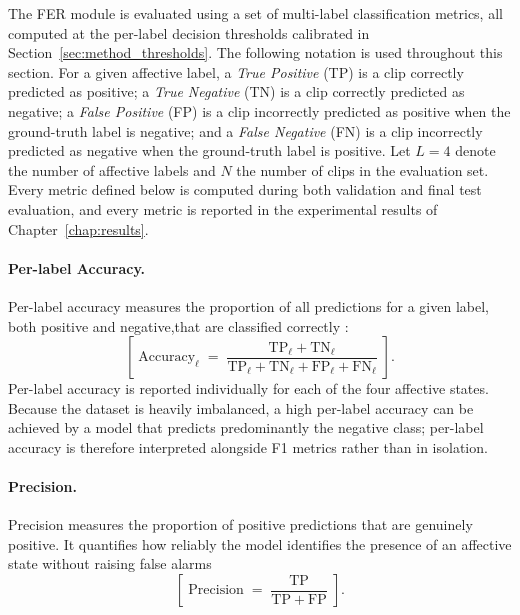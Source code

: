 The \ac{FER} module is evaluated using a set of multi-label classification metrics, all computed at the per-label decision thresholds calibrated in Section~\ref{sec:method_thresholds}. The following notation is used throughout this section. For a given affective label, a \emph{True Positive} (TP) is a clip correctly predicted as positive; a \emph{True Negative} (TN) is a clip correctly predicted as negative; a \emph{False Positive} (FP) is a clip incorrectly predicted as positive when the ground-truth label is negative; and a \emph{False Negative} (FN) is a clip incorrectly predicted as negative when the ground-truth label is positive. Let $L = 4$ denote the number of affective labels and $N$ the number of clips in the evaluation set. Every metric defined below is computed during both validation and final test evaluation, and every metric is reported in the experimental results of Chapter~\ref{chap:results}.

\paragraph{Per-label Accuracy.}
Per-label accuracy measures the proportion of all predictions for a given label, both positive and negative,that are classified correctly \cite{gothwal_vibed-net_2025}:
\begin{equation}
\left[\; \mathrm{Accuracy}_{\ell} \;=\; \frac{\mathrm{TP}_{\ell} + \mathrm{TN}_{\ell}}{\mathrm{TP}_{\ell} + \mathrm{TN}_{\ell} + \mathrm{FP}_{\ell} + \mathrm{FN}_{\ell}} \;\right].
\label{eq:accuracy}
\end{equation}
Per-label accuracy is reported individually for each of the four affective states. Because the dataset is heavily imbalanced, a high per-label accuracy can be achieved by a model that predicts predominantly the negative class; per-label accuracy is therefore interpreted alongside F1 metrics rather than in isolation.


\paragraph{Precision.}
Precision measures the proportion of positive predictions that are genuinely positive. It quantifies how reliably the model identifies the presence of an affective state without raising false alarms \cite{gothwal_vibed-net_2025}
\begin{equation}
\left[\; \mathrm{Precision} \;=\; \frac{\mathrm{TP}}{\mathrm{TP} + \mathrm{FP}} \;\right].
\label{eq:precision}
\end{equation}

